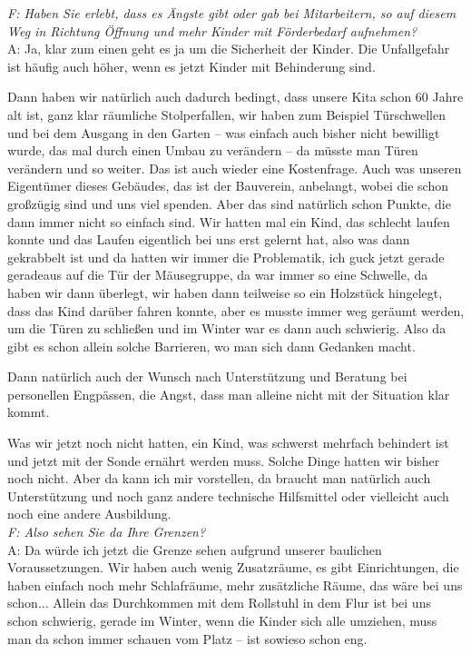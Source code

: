 \begin{linenumbers*}
\emph{F: Haben Sie erlebt, dass es Ängste gibt oder gab bei Mitarbeitern, so auf diesem Weg in Richtung Öffnung und mehr Kinder mit Förderbedarf aufnehmen?}\\
A: Ja, klar zum einen geht es ja um die Sicherheit der Kinder. Die Unfallgefahr ist häufig auch höher, wenn es jetzt Kinder mit Behinderung sind.   

Dann haben wir natürlich auch dadurch bedingt, dass unsere Kita schon 60 Jahre alt ist, ganz klar räumliche Stolperfallen, wir haben zum Beispiel Türschwellen und bei dem Ausgang in den Garten -- was einfach auch bisher nicht bewilligt wurde, das mal durch einen Umbau zu verändern -- da müsste man Türen verändern und so weiter. Das ist auch wieder eine Kostenfrage. Auch was unseren Eigentümer dieses Gebäudes, das ist der Bauverein, anbelangt, wobei die schon großzügig sind und uns viel spenden. Aber das sind natürlich schon Punkte, die dann immer nicht so einfach sind. Wir hatten mal ein Kind, das schlecht laufen konnte und das Laufen eigentlich bei uns erst gelernt hat, also was dann gekrabbelt ist und da hatten wir immer die Problematik, ich guck jetzt gerade geradeaus auf die Tür der Mäusegruppe, da war immer so eine Schwelle, da haben wir dann überlegt, wir haben dann teilweise so ein Holzstück hingelegt, dass das Kind darüber fahren konnte, aber es musste immer weg geräumt werden, um die Türen zu schließen und im Winter war es dann auch schwierig. Also da gibt es schon allein solche Barrieren, wo man sich dann Gedanken macht.    

Dann natürlich auch der Wunsch nach Unterstützung und Beratung bei personellen Engpässen, die Angst, dass man alleine nicht mit der Situation klar kommt.  

Was wir jetzt noch nicht hatten, ein Kind, was schwerst mehrfach behindert ist und jetzt mit der Sonde ernährt werden muss. Solche Dinge hatten wir bisher noch nicht. Aber da kann ich mir vorstellen, da braucht man natürlich auch Unterstützung und noch ganz andere technische Hilfsmittel oder vielleicht auch noch eine andere Ausbildung.\\
\emph{F: Also sehen Sie da Ihre Grenzen?}\\
A: Da würde ich jetzt die Grenze sehen aufgrund unserer baulichen Voraussetzungen. Wir haben auch wenig Zusatzräume, es gibt Einrichtungen, die haben einfach noch mehr Schlafräume, mehr zusätzliche Räume, das wäre bei uns schon... Allein das Durchkommen mit dem Rollstuhl in dem Flur ist bei uns schon schwierig, gerade im Winter, wenn die Kinder sich alle umziehen, muss man da schon immer schauen vom Platz -- ist sowieso schon eng.  


\end{linenumbers*}

